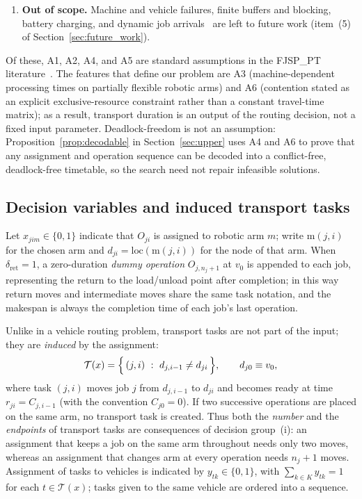 \documentclass[manuscript,screen,review]{acmart}
\begin{document}
\begin{enumerate}[label=\textbf{A\arabic*.},leftmargin=*,topsep=2pt,itemsep=2pt]
\item \textbf{Out of scope.} Machine and vehicle failures, finite buffers and blocking, battery charging, and dynamic
job arrivals~\cite{gui2023dynamic,zhao2026deep} are left to future work (item~(5) of Section~\ref{sec:future_work}).
\end{enumerate}

Of these, A1, A2, A4, and A5 are standard assumptions in the FJSP\_PT literature~\cite{xin2025review}. The features that define our problem are A3 (machine-dependent processing times on partially flexible robotic arms) and A6 (contention stated as an explicit exclusive-resource constraint rather than a constant travel-time matrix);
as a result, transport duration is an output of the routing decision, not a fixed input parameter.
Deadlock-freedom is not an assumption: Proposition~\ref{prop:decodable} in Section~\ref{sec:upper} uses A4 and A6 to prove that any assignment and operation sequence can be decoded into a conflict-free, deadlock-free timetable, so the search need not repair infeasible solutions.

\subsection{Decision variables and induced transport tasks}

Let $x_{jim}\in\{0,1\}$ indicate that $O_{ji}$ is assigned to robotic arm $m$; write $\mathrm{m}(j,i)$ for the chosen arm and
$d_{ji}=\mathrm{loc}(\mathrm{m}(j,i))$ for the node of that arm. When $\delta_{\mathrm{ret}}=1$,
a zero-duration \emph{dummy operation} $O_{j,n_j+1}$ at $v_0$ is appended to each job, representing the return to the load/unload point after completion;
in this way return moves and intermediate moves share the same task notation, and the makespan is always the completion time of each job's last operation.

Unlike in a vehicle routing problem, transport tasks are not part of the input; they are \emph{induced} by the assignment:
\begin{equation}
\label{eq:tasks}
\mathcal{T}(x)=\Bigl\{\,(j,i)\ :\ d_{j,i-1}\neq d_{ji}\,\Bigr\},
\qquad d_{j0}\equiv v_0 ,
\end{equation}
where task $(j,i)$ moves job $j$ from $d_{j,i-1}$ to $d_{ji}$ and becomes ready at time
$r_{ji}=C_{j,i-1}$ (with the convention $C_{j0}=0$). If two successive operations are placed on the same arm, no
transport task is created. Thus both the \emph{number} and the \emph{endpoints} of transport tasks are consequences of decision group~(i): an assignment that keeps a job
on the same arm throughout needs only two moves, whereas an assignment that changes arm at every operation needs $n_j+1$ moves.
Assignment of tasks to vehicles is indicated by $y_{tk}\in\{0,1\}$, with
$\sum_{k\in K}y_{tk}=1$ for each $t\in\mathcal{T}(x)$; tasks given to the same vehicle are ordered into a sequence.
\end{document}
